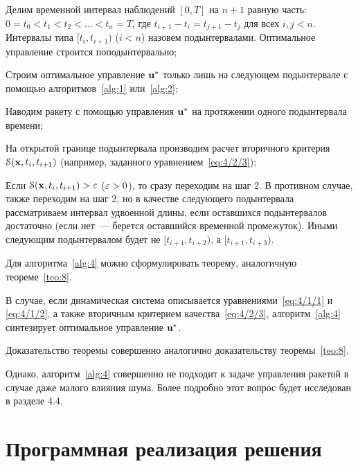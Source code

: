    \benum
        \item
            Делим временной интервал наблюдений $[0, T]$ на $n+1$ равную часть: $0 = t_0 < t_1 < t_2 < \ldots < t_{n} = T$, где $t_{i+1}-t_i = t_{j+1}-t_j$ для всех $i, j < n$. Интервалы типа $[t_i, t_{i+1})$ ($i<n$) назовем подынтервалами. Оптимальное управление строится поподынтервально;

        \item
            Строим оптимальное управление $\mathbf{u}^{*}$ только лишь на следующем подынтервале с помощью алгоритмов~\ref{alg:1} или~\vref{alg:2};

        \item
            Наводим ракету с помощью управления $\mathbf{u}^{*}$ на протяжении одного подынтервала времени;

        \item
            На открытой границе подынтервала производим расчет вторичного критерия $\mathcal{S}(\mathbf{x}, t_i, t_{i+1})$ (например, заданного уравнением~\ref{eq:4/2/3});

        \item
            Если $\mathcal{S}(\mathbf{x}, t_i, t_{i+1}) > \varepsilon$ ($\varepsilon > 0$), то сразу переходим на шаг 2. В противном случае, также переходим на шаг 2, но в качестве следующего подынтервала рассматриваем интервал удвоенной длины, если оставшихся подынтервалов достаточно (если нет~--- берется оставшийся временной промежуток). Иными следующим подынтервалом будет не $[t_{i+1}, t_{i+2})$, а $[t_{i+1}, t_{i+3})$.
    \eenum
\ealgo

Для алгоритма~\ref{alg:4} можно сформулировать теорему, аналогичную теореме~\ref{teo:8}.

    В случае, если динамическая система описывается уравнениями~\ref{eq:4/1/1} и \vref{eq:4/1/2}, а также вторичным критерием качества~\vref{eq:4/2/3}, алгоритм~\ref{alg:4} синтезирует оптимальное управление $\mathbf{u}^{*}$.
\eteo

Доказательство теоремы совершенно аналогично доказательству теоремы~\ref{teo:8}.

Однако, алгоритм~\ref{alg:4} совершенно не подходит к задаче управления ракетой в случае даже малого влияния шума. Более подробно этот вопрос будет исследован в разделе 4.4.



\section{Программная реализация решения}



